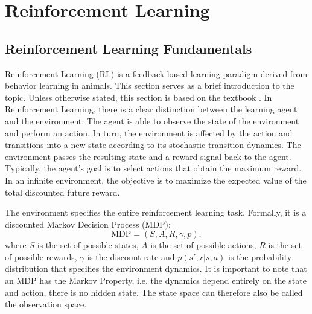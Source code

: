 \section{Reinforcement Learning}



\subsection{Reinforcement Learning Fundamentals}
Reinforcement Learning (RL) is a feedback-based learning paradigm derived from behavior learning in animals.
This section serves as a brief introduction to the topic.
Unless otherwise stated, this section is based on the textbook \cite{sutton2018ReinforcementLearningIntroduction}.
In Reinforcement Learning, there is a clear distinction between the learning agent and the environment.
The agent is able to observe the state of the environment and perform an action.
In turn, the environment is affected by the action and transitions into a new state according to its stochastic transition dynamics.
The environment passes the resulting state and a reward signal back to the agent.
Typically, the agent's goal is to select actions that obtain the maximum reward.
In an infinite environment, the objective is to maximize the expected value of the total discounted future reward.

The environment specifies the entire reinforcement learning task.
Formally, it is a discounted Markov Decision Process (MDP):
$$ \text{MDP} = (S, A, R, \gamma, p),$$
where $S$ is the set of possible states, $A$ is the set of possible actions, $R$ is the set of possible rewards, $\gamma$ is the discount rate and $p(s', r|s,a)$ is the probability distribution that specifies the environment dynamics.
It is important to note that an MDP has the Markov Property, i.e. the dynamics depend entirely on the state and action, there is no hidden state.
The state space can therefore also be called the observation space.

